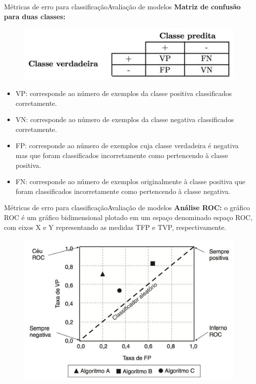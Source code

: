 \documentclass[t]{beamer}
\begin{document}

\begin{ftst}{Métricas de erro para classificação}{Avaliação de modelos}
\justifying
\textbf{Matriz de confusão para duas classes:}

\begin{figure}
    \centering
    \includegraphics[scale=0.7]{Figuras/slide04_06.jpg}
\end{figure}
\footnotesize
\begin{itemize}
    \item VP: corresponde ao número de exemplos da classe positiva classificados corretamente.
    \item VN: corresponde ao número de exemplos da classe negativa classificados corretamente.
    \item FP: corresponde ao número de exemplos cuja classe verdadeira é negativa mas que foram classificados incorretamente como pertencendo à classe positiva.
    \item FN: corresponde ao número de exemplos originalmente à classe positiva que foram classificados incorretamente como pertencendo à classe negativa.
\end{itemize}

\end{ftst}


\begin{ftst}{Métricas de erro para classificação}{Avaliação de modelos}
\justifying
\small
\textbf{Análise ROC:} o gráfico ROC é um gráfico bidimensional plotado em um espaço denominado espaço ROC, com eixos X e Y representando as medidas TFP e TVP, respectivamente.

\begin{figure}
    \centering
    \includegraphics[scale=0.5]{Figuras/slide04_07.jpg}
\end{figure}



\end{ftst}
\end{document}
